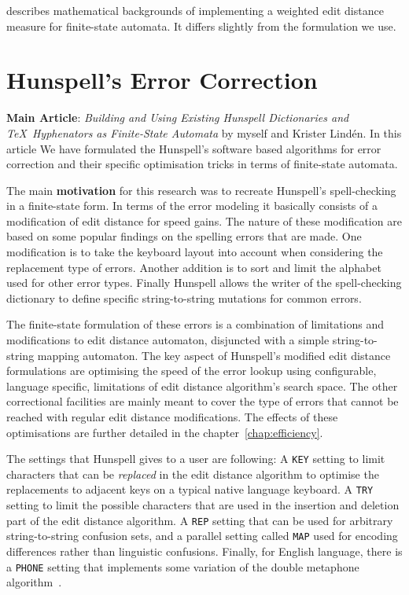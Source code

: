\documentclass[officiallayout]{unihelcompling}
\begin{document}
\citet{mohri2003edit} describes mathematical backgrounds of
implementing a weighted edit distance measure for finite-state automata. It
differs slightly from the formulation we use.

\section{Hunspell's Error Correction}
\label{sec:Hunspell-error}

\textbf{Main Article}: \emph{Building and Using Existing Hunspell Dictionaries
and \TeX\ Hyphenators as Finite-State Automata} by myself and Krister Lindén.
In this article We have formulated the Hunspell's software based algorithms for
error correction and their specific optimisation tricks in terms of
finite-state automata.

The main \textbf{motivation} for this research was to recreate Hunspell's
spell-checking in a finite-state form. In terms of the  error modeling it
basically consists of a modification of edit distance for speed gains. The
nature of these modification are based on some popular findings on the spelling
errors that are made. One modification is to take the keyboard layout into
account when considering the replacement type of errors. Another addition is to
sort and limit the alphabet used for other error types. Finally Hunspell allows
the writer of the spell-checking dictionary to define specific string-to-string
mutations for common errors.

The finite-state formulation of these errors is a combination of limitations
and modifications to edit distance automaton, disjuncted with a simple
string-to-string mapping automaton. The key aspect of Hunspell's modified
edit distance formulations are optimising the speed of the error lookup using
configurable, language specific, limitations of edit distance algorithm's
search space. The other correctional facilities are mainly meant to cover the
type of errors that cannot be reached with regular edit distance modifications.
The effects of these optimisations are further detailed in the 
chapter~\ref{chap:efficiency}.

The settings that Hunspell gives to a user are following: A \texttt{KEY}
setting to limit characters that can be \emph{replaced} in the edit distance
algorithm to optimise the replacements to adjacent keys on a typical native
language keyboard. A \texttt{TRY} setting to limit the possible characters
that are used in the insertion and deletion part of the edit distance
algorithm. A \texttt{REP} setting that can be used for arbitrary
string-to-string confusion sets, and a parallel setting called \texttt{MAP}
used for encoding differences rather than linguistic confusions.  Finally, for
English language, there is a \texttt{PHONE} setting that implements some
variation of the double metaphone algorithm~\citep{philips2000double}.
\end{document}
